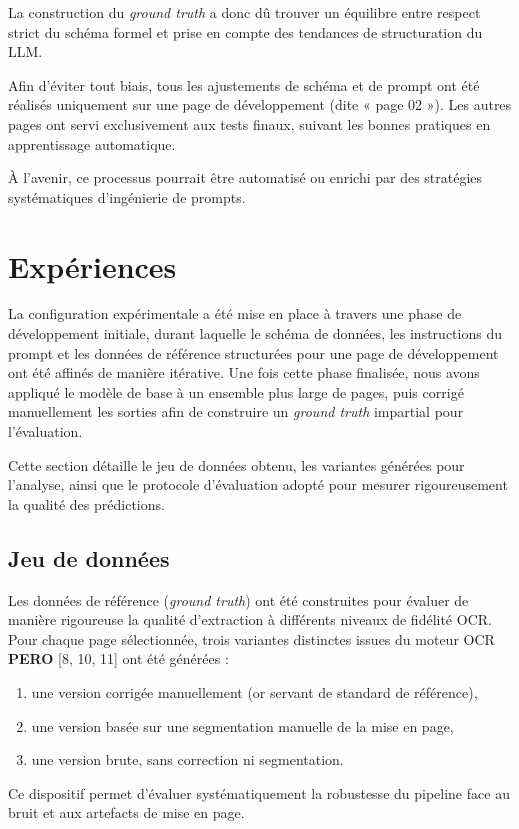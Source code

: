 La construction du \emph{ground truth} a donc dû trouver un équilibre entre respect strict du schéma formel et prise en compte des tendances de structuration du LLM.

Afin d’éviter tout biais, tous les ajustements de schéma et de prompt ont été réalisés uniquement sur une page de développement (dite « page 02 »). Les autres pages ont servi exclusivement aux tests finaux, suivant les bonnes pratiques en apprentissage automatique.

À l’avenir, ce processus pourrait être automatisé ou enrichi par des stratégies systématiques d’ingénierie de prompts.

\section{Expériences}

La configuration expérimentale a été mise en place à travers une phase de développement initiale, durant laquelle le schéma de données, les instructions du prompt et les données de référence structurées pour une page de développement ont été affinés de manière itérative. Une fois cette phase finalisée, nous avons appliqué le modèle de base à un ensemble plus large de pages, puis corrigé manuellement les sorties afin de construire un \emph{ground truth} impartial pour l’évaluation.

Cette section détaille le jeu de données obtenu, les variantes générées pour l’analyse, ainsi que le protocole d’évaluation adopté pour mesurer rigoureusement la qualité des prédictions.

\subsection{Jeu de données}

Les données de référence (\emph{ground truth}) ont été construites pour évaluer de manière rigoureuse la qualité d’extraction à différents niveaux de fidélité OCR. Pour chaque page sélectionnée, trois variantes distinctes issues du moteur OCR \textbf{PERO} [8, 10, 11] ont été générées :

\begin{enumerate}
\item une version corrigée manuellement (or servant de standard de référence),
\item une version basée sur une segmentation manuelle de la mise en page,
\item une version brute, sans correction ni segmentation.

\end{enumerate}
Ce dispositif permet d’évaluer systématiquement la robustesse du pipeline face au bruit et aux artefacts de mise en page.

